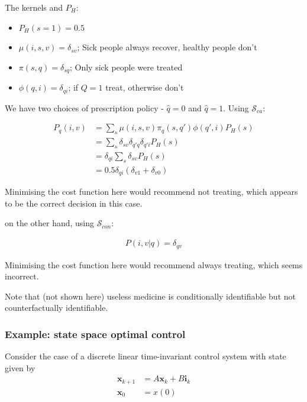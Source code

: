 The kernels and $P_H$:
\begin{itemize}
    \item $P_H(s=1) = 0.5$
    \item $\mu(i,s,v) =\delta_{sv}$; Sick people always recover, healthy people don't
    \item $\pi(s,q)=\delta_{sq}$; Only sick people were treated
    \item $\phi(q,i)=\delta_{qi}$; if $Q=1$ treat, otherwise don't
\end{itemize}

We have two choices of prescription policy - $\hat{q}=0$ and $\hat{q}=1$. Using $\mathscr{S}_{ca}$:

\begin{align}
    P_q(i,v) &= \sum_{s} \mu(i,s,v) \pi_{q}(s,q') \phi(q',i) P_H(s) \\
                         &= \sum_{s} \delta_{sv} \delta_{q'q} \delta_{q'i} P_H(s) \\
                         &= \delta_{qi} \sum_{s} \delta_{sv} P_H(s) \\
                         &= 0.5 \delta_{qi} (\delta_{v1} + \delta_{v0})
\end{align}

Minimising the cost function here would recommend not treating, which appears to be the correct decision in this case.

on the other hand, using $\mathscr{S}_{con}$:

\begin{align}
    P(i,v|q) = \delta_{qv}
\end{align}

Minimising the cost function here would recommend always treating, which seems incorrect.

Note that (not shown here) useless medicine is conditionally identifiable but not counterfactually identifiable.

\subsubsection{Example: state space optimal control}

Consider the case of a discrete linear time-invariant control system with state given by
\begin{align}
    \mathbf{x}_{k+1} &= A\mathbf{x}_k + B\mathbf{i}_k\\
    \mathbf{x}_0 &= x(0)
\end{align}

